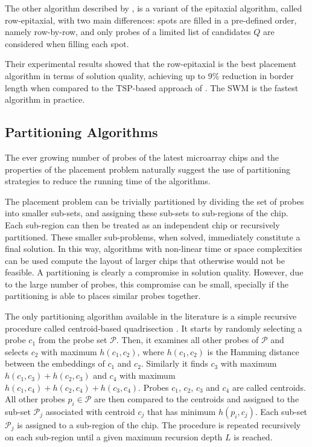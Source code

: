 \documentclass{bioinfo}
\begin{document}
The other algorithm described by \citealp{KAHNG03A}, is a variant of the epitaxial algorithm, called row-epitaxial, with two main differences: spots are filled in a pre-defined order, namely row-by-row, and only probes of a limited list of candidates $Q$ are considered when filling each spot.

Their experimental results showed that the row-epitaxial is the best placement algorithm in terms of solution quality, achieving up to 9\% reduction in border length when compared to the TSP-based approach of \citealp{HANNENHALLI02}. The SWM is the fastest algorithm in practice.

\subsection{Partitioning Algorithms}
\label{sec:partition}

The ever growing number of probes of the latest microarray chips and the  properties of the placement problem naturally suggest the use of partitioning strategies to reduce the running time of the algorithms.

The placement problem can be trivially partitioned by dividing the set of probes into smaller sub-sets, and assigning these sub-sets to sub-regions of the chip. Each sub-region can then be treated as an independent chip or recursively partitioned. These smaller sub-problems, when solved, immediately constitute a final solution. In this way, algorithms with non-linear time or space complexities can be used compute the layout of larger chips that otherwise would not be feasible. A partitioning is clearly a compromise in solution quality. However, due to the large number of probes, this compromise can be small, specially if the partitioning is able to places similar probes together.

The only partitioning algorithm available in the literature is a simple recursive procedure called centroid-based quadrisection \citep{KAHNG03B}. It starts by randomly selecting a probe $c_1$ from the probe set $\mathcal{P}$. Then, it examines all other probes of $\mathcal{P}$ and selects $c_2$ with maximum $h(c_1,c_2)$, where $h(c_1,c_2)$ is the Hamming distance between the embeddings of $c_1$ and $c_2$. Similarly it finds $c_3$ with maximum $h(c_1,c_3) + h(c_2,c_3)$ and $c_4$ with maximum $h(c_1,c_4) + h(c_2,c_4) + h(c_3,c_4)$. Probes $c_1$, $c_2$, $c_3$ and $c_4$ are called centroids. All other probes $p_i \in \mathcal{P}$ are then compared to the centroids and assigned to the sub-set $\mathcal{P}_j$ associated with centroid $c_j$ that has minimum $h(p_i,c_j)$. Each sub-set $\mathcal{P}_j$ is assigned to a sub-region of the chip. The procedure is repeated recursively on each sub-region until a given maximum recursion depth $L$ is reached.
\end{document}
